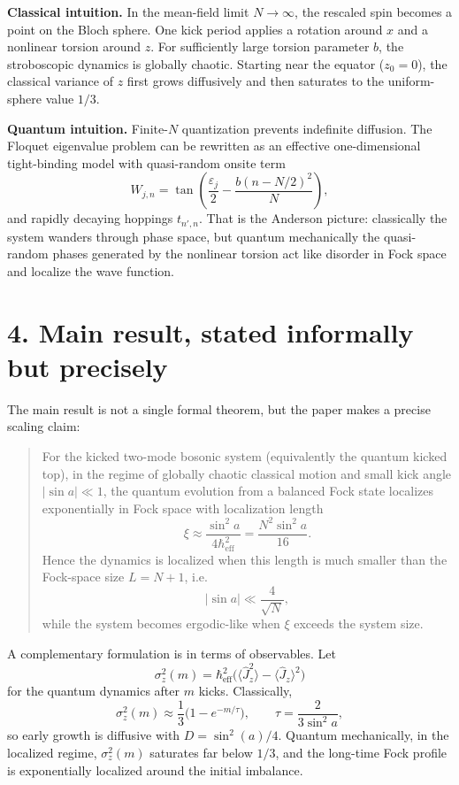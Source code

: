 \documentclass[11pt]{article}
\begin{document}
\textbf{Classical intuition.} In the mean-field limit $N\to\infty$, the rescaled spin becomes a point on the Bloch sphere. One kick period applies a rotation around $x$ and a nonlinear torsion around $z$. For sufficiently large torsion parameter $b$, the stroboscopic dynamics is globally chaotic. Starting near the equator ($z_0=0$), the classical variance of $z$ first grows diffusively and then saturates to the uniform-sphere value $1/3$.

\textbf{Quantum intuition.} Finite-$N$ quantization prevents indefinite diffusion. The Floquet eigenvalue problem can be rewritten as an effective one-dimensional tight-binding model with quasi-random onsite term
\[
W_{j,n}=\tan\!\left(\frac{\varepsilon_j}{2}-\frac{b(n-N/2)^2}{N}\right),
\]
and rapidly decaying hoppings $t_{n',n}$. That is the Anderson picture: classically the system wanders through phase space, but quantum mechanically the quasi-random phases generated by the nonlinear torsion act like disorder in Fock space and localize the wave function.

\section*{4. Main result, stated informally but precisely}
The main result is not a single formal theorem, but the paper makes a precise scaling claim:

\begin{quote}
For the kicked two-mode bosonic system (equivalently the quantum kicked top), in the regime of globally chaotic classical motion and small kick angle $|\sin a|\ll 1$, the quantum evolution from a balanced Fock state localizes exponentially in Fock space with localization length
\[
\xi \approx \frac{\sin^2 a}{4\hbar_\mathrm{eff}^2} = \frac{N^2\sin^2 a}{16}.
\]
Hence the dynamics is localized when this length is much smaller than the Fock-space size $L=N+1$, i.e.
\[
|\sin a|\ll \frac{4}{\sqrt{N}},
\]
while the system becomes ergodic-like when $\xi$ exceeds the system size.
\end{quote}

A complementary formulation is in terms of observables. Let
\[
\sigma_z^2(m)=\hbar_\mathrm{eff}^2\big(\langle \hat J_z^2\rangle-\langle \hat J_z\rangle^2\big)
\]
for the quantum dynamics after $m$ kicks. Classically,
\[
\sigma_z^2(m)\approx \frac{1}{3}\big(1-e^{-m/\tau}\big),\qquad \tau=\frac{2}{3\sin^2 a},
\]
so early growth is diffusive with $D=\sin^2(a)/4$. Quantum mechanically, in the localized regime, $\sigma_z^2(m)$ saturates far below $1/3$, and the long-time Fock profile is exponentially localized around the initial imbalance.
\end{document}
